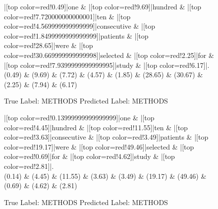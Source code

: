 \documentclass[a4paper, landscape]{article}
\begin{document}
\begin{figure}
\begin{center}
\begin{dependency}
\begin{deptext}
|[top color=red!0.49]|one \& |[top color=red!9.69]|hundred \& |[top color=red!7.720000000000001]|ten \& |[top color=red!4.569999999999999]|consecutive \& |[top color=red!1.8499999999999999]|patients \& |[top color=red!28.65]|were \& |[top color=red!30.669999999999998]|selected \& |[top color=red!2.25]|for \& |[top color=red!7.9399999999999995]|study \& |[top color=red!6.17]|.\\
(0.49) \& (9.69) \& (7.72) \& (4.57) \& (1.85) \& (28.65) \& (30.67) \& (2.25) \& (7.94) \& (6.17)\\
\end{deptext}
\end{dependency}
\end{center}
\caption{True Label: METHODS Predicted Label: METHODS}
\end{figure}
\clearpage
\begin{figure}
\begin{center}
\begin{dependency}
\begin{deptext}
|[top color=red!0.13999999999999999]|one \& |[top color=red!4.45]|hundred \& |[top color=red!11.55]|ten \& |[top color=red!3.63]|consecutive \& |[top color=red!3.49]|patients \& |[top color=red!19.17]|were \& |[top color=red!49.46]|selected \& |[top color=red!0.69]|for \& |[top color=red!4.62]|study \& |[top color=red!2.81]|.\\
(0.14) \& (4.45) \& (11.55) \& (3.63) \& (3.49) \& (19.17) \& (49.46) \& (0.69) \& (4.62) \& (2.81)\\
\end{deptext}
\end{dependency}
\end{center}
\caption{True Label: METHODS Predicted Label: METHODS}
\end{figure}
\end{document}
